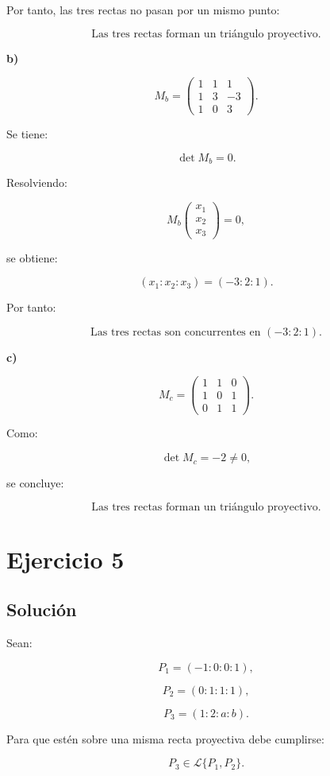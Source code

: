 \documentclass[11pt,a4paper]{article}
\begin{document}
Por tanto, las tres rectas no pasan por un mismo punto:

\[
\boxed{
\text{Las tres rectas forman un triángulo proyectivo.}
}
\]

\textbf{b)}

\[
M_b=
\begin{pmatrix}
1&1&1\\
1&3&-3\\
1&0&3
\end{pmatrix}.
\]

Se tiene:

\[
\det M_b=0.
\]

Resolviendo:

\[
M_b
\begin{pmatrix}
x_1\\x_2\\x_3
\end{pmatrix}
=0,
\]

se obtiene:

\[
(x_1:x_2:x_3)=(-3:2:1).
\]

Por tanto:

\[
\boxed{
\text{Las tres rectas son concurrentes en }(-3:2:1).
}
\]

\textbf{c)}

\[
M_c=
\begin{pmatrix}
1&1&0\\
1&0&1\\
0&1&1
\end{pmatrix}.
\]

Como:

\[
\det M_c=-2\neq0,
\]

se concluye:

\[
\boxed{
\text{Las tres rectas forman un triángulo proyectivo.}
}
\]

\section{Ejercicio 5}
\subsection{Solución}

Sean:

\[
P_1=(-1:0:0:1),
\]

\[
P_2=(0:1:1:1),
\]

\[
P_3=(1:2:a:b).
\]

Para que estén sobre una misma recta proyectiva debe cumplirse:

\[
P_3\in\mathcal L\{P_1,P_2\}.
\]
\end{document}
